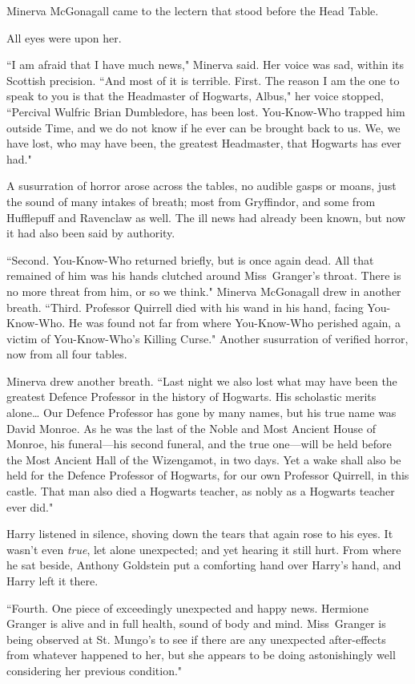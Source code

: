 Minerva McGonagall came to the lectern that stood before the Head Table.

All eyes were upon her.

``I am afraid that I have much news," Minerva said. Her voice was sad, within its Scottish precision. ``And most of it is terrible. First. The reason I am the one to speak to you is that the Headmaster of Hogwarts, Albus," her voice stopped, ``Percival Wulfric Brian Dumbledore, has been lost. You-Know-Who trapped him outside Time, and we do not know if he ever can be brought back to us. We, we have lost, who may have been, the greatest Headmaster, that Hogwarts has ever had."

A susurration of horror arose across the tables, no audible gasps or moans, just the sound of many intakes of breath; most from Gryffindor, and some from Hufflepuff and Ravenclaw as well. The ill news had already been known, but now it had also been said by authority.

``Second. You-Know-Who returned briefly, but is once again dead. All that remained of him was his hands clutched around Miss~Granger's throat. There is no more threat from him, or so we think." Minerva McGonagall drew in another breath. ``Third. Professor Quirrell died with his wand in his hand, facing You-Know-Who. He was found not far from where You-Know-Who perished again, a victim of You-Know-Who's Killing Curse." Another susurration of verified horror, now from all four tables.

Minerva drew another breath. ``Last night we also lost what may have been the greatest Defence Professor in the history of Hogwarts. His scholastic merits alone{\ldots} Our Defence Professor has gone by many names, but his true name was David Monroe. As he was the last of the Noble and Most Ancient House of Monroe, his funeral—his second funeral, and the true one—will be held before the Most Ancient Hall of the Wizengamot, in two days. Yet a wake shall also be held for the Defence Professor of Hogwarts, for our own Professor Quirrell, in this castle. That man also died a Hogwarts teacher, as nobly as a Hogwarts teacher ever did."

Harry listened in silence, shoving down the tears that again rose to his eyes. It wasn't even \emph{true}, let alone unexpected; and yet hearing it still hurt. From where he sat beside, Anthony Goldstein put a comforting hand over Harry's hand, and Harry left it there.

``Fourth. One piece of exceedingly unexpected and happy news. Hermione Granger is alive and in full health, sound of body and mind. Miss~Granger is being observed at St. Mungo's to see if there are any unexpected after-effects from whatever happened to her, but she appears to be doing astonishingly well considering her previous condition."

